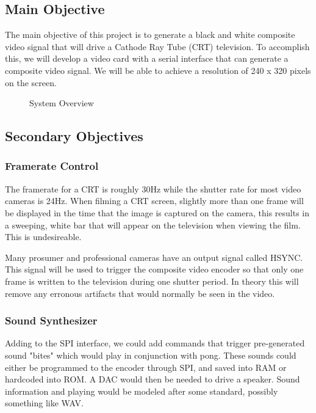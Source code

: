 \subsection*{Main Objective}

The main objective of this project is to generate a black and white composite
video signal that will drive a Cathode Ray Tube (CRT) television. To accomplish
this, we will develop a video card with a serial interface that can generate a
composite video signal. We will be able to achieve a resolution of 240 x 320
pixels on the screen.

\begin{figure}[H]
   \centering
   \caption{System Overview}
\end{figure}

\subsection*{Secondary Objectives}

\subsubsection*{Framerate Control}

The framerate for a CRT is roughly 30Hz while the shutter rate for most video
cameras is 24Hz. When filming a CRT screen, slightly more than one frame will be
displayed in the time that the image is captured on the camera, this results in
a sweeping, white bar that will appear on the television when viewing the film.
This is undesireable.

Many prosumer and professional cameras have an output signal called HSYNC. This
signal will be used to trigger the composite video encoder so that only one
frame is written to the television during one shutter period. In theory this
will remove any erronous artifacts that would normally be seen in the video.

\subsubsection*{Sound Synthesizer}

Adding to the SPI interface, we could add commands that trigger pre-generated
sound "bites" which would play in conjunction with pong. These sounds could
either be programmed to the encoder through SPI, and saved into RAM or hardcoded
into ROM. A DAC would then be needed to drive a speaker. Sound information and
playing would be modeled after some standard, possibly something like WAV.

